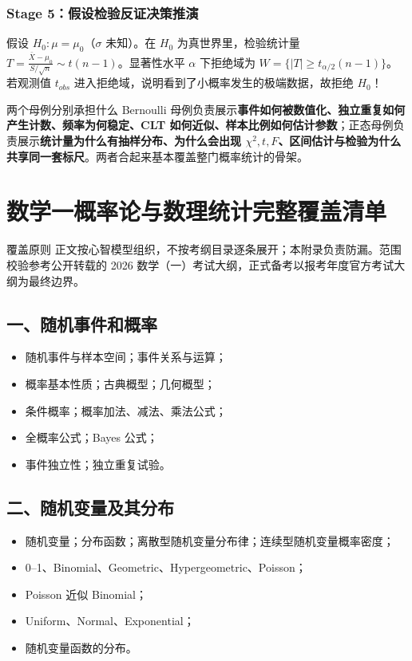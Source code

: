 \documentclass[11pt,a4paper,openany]{ctexbook}
\newcommand{\key}[1]{\textbf{\color{deep}#1}}
\begin{document}
\subsection{Stage 5：假设检验反证决策推演}
假设 $H_0: \mu = \mu_0$（$\sigma$ 未知）。在 $H_0$ 为真世界里，检验统计量 $T = \frac{\bar X - \mu_0}{S/\sqrt n} \sim t(n-1)$。显著性水平 $\alpha$ 下拒绝域为 $W = \{ \lvert T\rvert \ge t_{\alpha/2}(n-1) \}$。若观测值 $t_{obs}$ 进入拒绝域，说明看到了小概率发生的极端数据，故拒绝 $H_0$！

\begin{corebox}{两个母例分别承担什么}
Bernoulli 母例负责展示\key{事件如何被数值化、独立重复如何产生计数、频率为何稳定、CLT 如何近似、样本比例如何估计参数}；正态母例负责展示\key{统计量为什么有抽样分布、为什么会出现 $\chi^2,t,F$、区间估计与检验为什么共享同一套标尺}。两者合起来基本覆盖整门概率统计的骨架。
\end{corebox}

\appendix
\chapter{数学一概率论与数理统计完整覆盖清单}

\begin{methodbox}{覆盖原则}
正文按心智模型组织，不按考纲目录逐条展开；本附录负责防漏。范围校验参考公开转载的 2026 数学（一）考试大纲，正式备考以报考年度官方考试大纲为最终边界。
\end{methodbox}

\section*{一、随机事件和概率}
\begin{itemize}
\item 随机事件与样本空间；事件关系与运算；
\item 概率基本性质；古典概型；几何概型；
\item 条件概率；概率加法、减法、乘法公式；
\item 全概率公式；Bayes 公式；
\item 事件独立性；独立重复试验。
\end{itemize}

\section*{二、随机变量及其分布}
\begin{itemize}
\item 随机变量；分布函数；离散型随机变量分布律；连续型随机变量概率密度；
\item 0--1、Binomial、Geometric、Hypergeometric、Poisson；
\item Poisson 近似 Binomial；
\item Uniform、Normal、Exponential；
\item 随机变量函数的分布。
\end{itemize}
\end{document}
